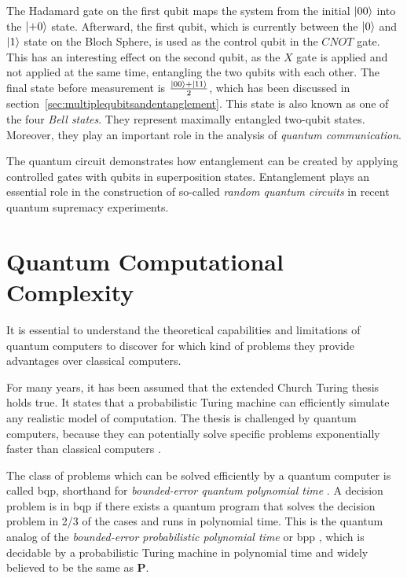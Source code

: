 The Hadamard gate on the first qubit maps the system from the initial $\Ket{00}$
into the $\Ket{+0}$ state. Afterward, the first qubit, which is currently
between the $\Ket{0}$ and $\Ket{1}$ state on the Bloch Sphere, is used as the
control qubit in the $CNOT$ gate. This has an interesting effect on the second qubit,
as the $X$ gate is applied and not applied at the same time, entangling
the two qubits with each other. The final state before measurement is
$\frac{\Ket{00} + \Ket{11}}{2}$, which has been discussed in section~\ref{sec:multiplequbitsandentanglement}.
This state is also known as one of the four \textit{Bell states}. They represent maximally
entangled two-qubit states. Moreover, they play an important role in the analysis of
\textit{quantum communication}.

The quantum circuit demonstrates how entanglement can be created by applying controlled gates with qubits in superposition states.
Entanglement plays an essential role in the construction of so-called \textit{random
quantum circuits} in recent quantum supremacy experiments.


\section{Quantum Computational Complexity}
\label{sec:quantum_computational_complexity}

It is essential to understand the theoretical capabilities and limitations of quantum computers to discover for which kind of problems
they provide advantages over classical computers. 

For many years, it has been assumed that the extended Church Turing thesis holds true. It states that a probabilistic
Turing machine can efficiently simulate any realistic model of computation. The thesis is challenged by quantum computers, because they can potentially solve specific problems exponentially faster than classical computers \cite{feynman1982simulating}.

The class of problems which can be solved efficiently by a quantum
computer is called \gls{bqp}, shorthand for \textit{bounded-error quantum
  polynomial time} \cite{Bernstein93quantumcomplexity}. A decision problem is in \gls{bqp} if there exists a quantum
program that solves the decision problem in 2/3 of the cases and runs in
polynomial time. This is the quantum analog of the \textit{bounded-error
  probabilistic polynomial time} or \gls{bpp} \cite{gill1977computational}, which is decidable by a
probabilistic Turing machine in polynomial time and widely believed to be the same as
\textbf{P}.

